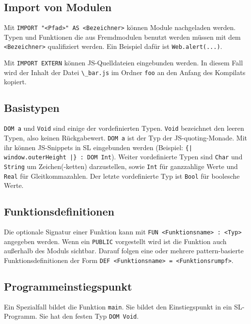\documentclass[12pt,bibtotoc]{scrreprt}
\begin{document}
\subsection{Import von Modulen}

Mit \lstinline!IMPORT "<Pfad>" AS <Bezeichner>! können Module nachgeladen werden. Typen und Funktionen die aus Fremdmodulen benutzt werden müssen mit dem \lstinline!<Bezeichner>! qualifiziert werden. Ein Beispiel dafür ist \lstinline!Web.alert(...)!. 
  
  Mit \lstinline!IMPORT EXTERN! können \ac{JS}-Quelldateien eingebunden werden. In diesem Fall wird der Inhalt der Datei \lstinline!\_bar.js! im Ordner \lstinline!foo! an den Anfang des Kompilats kopiert.

\subsection{Basistypen}

\lstinline!DOM a! und \lstinline!Void! sind einige der vordefinierten Typen. \lstinline!Void! bezeichnet den leeren Typen, also keinen Rückgabewert. \lstinline!DOM a! ist der Typ der JS-quoting-Monade. Mit ihr können JS-Snippets in SL eingebunden werden (Beispiel: \lstinline!{| window.outerHeight |} : DOM Int!). Weiter vordefinierte Typen sind \lstinline!Char! und \lstinline!String! um Zeichen(-ketten) darzustellen, sowie \lstinline!Int! für ganzzahlige Werte und \lstinline!Real! für Gleitkommazahlen. Der letzte vordefinierte Typ ist \lstinline!Bool! für boolesche Werte.
  
\subsection{Funktionsdefinitionen}

Die optionale Signatur einer Funktion kann mit \lstinline!FUN <Funktionsname> : <Typ>! angegeben werden. Wenn ein \lstinline!PUBLIC! vorgestellt wird ist die Funktion auch außerhalb des Moduls sichtbar. Darauf folgen eine oder mehrere pattern-basierte Funktionsdefinitionen der Form \lstinline!DEF <Funktionsname> = <Funktionsrumpf>!.


\subsection{Programmeinstiegspunkt}

Ein Spezialfall bildet die Funktion \lstinline!main!. Sie bildet den Einstiegspunkt in ein SL-Programm. Sie hat den festen Typ \lstinline!DOM Void!. 
\end{document}
